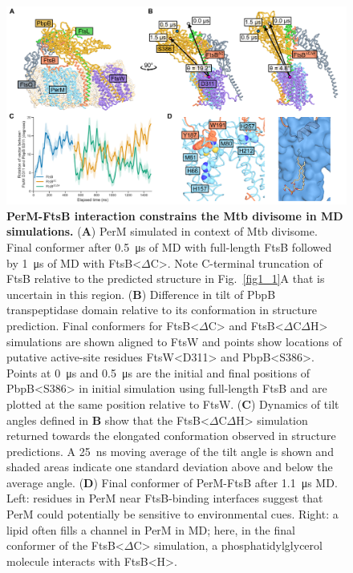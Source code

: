 \documentclass[twocolumn,pdflatex,sn-nature]{sn-jnl}%
\def\textsuperscript#1{<#1>}%
\newcommand\mtb{Mtb}
\newcommand\ftsbH{FtsB\textsuperscript{H}}
\newcommand\ftsbdCdH{FtsB\textsuperscript{$\Delta{}$C$\Delta{}$H}}
\newcommand\ftsbdC{FtsB\textsuperscript{$\Delta{}$C}}
\begin{document}
\begin{figure}[b]
    \centering
    \includegraphics[width=1.0\textwidth]{../figures/fig5.png}
    \caption{
        \textbf{PerM-FtsB interaction constrains the \mtb{} divisome in MD simulations.}
        (\textbf{A}) PerM simulated in context of \mtb{} divisome. Final conformer after \qty{0.5}{\us} of MD with full-length FtsB followed by \qty{1}{\us} of MD with \ftsbdC{}. Note C-terminal truncation of FtsB relative to the predicted structure in Fig.~\ref{fig1_1}A that is uncertain in this region.
        (\textbf{B}) Difference in tilt of PbpB transpeptidase domain relative to its conformation in structure prediction. Final conformers for \ftsbdC{} and \ftsbdCdH{} simulations are shown aligned to FtsW and points show locations of putative active-site residues FtsW\textsuperscript{D311} and PbpB\textsuperscript{S386}. Points at \qty{0}{\us} and \qty{0.5}{\us} are the initial and final positions of PbpB\textsuperscript{S386} in initial simulation using full-length FtsB and are plotted at the same position relative to FtsW.
        (\textbf{C}) Dynamics of tilt angles defined in \textbf{B} show that the \ftsbdCdH{} simulation returned towards the elongated conformation observed in structure predictions. A \qty{25}{\ns} moving average of the tilt angle is shown and shaded areas indicate one standard deviation above and below the average angle. (\textbf{D}) Final conformer of PerM-FtsB after \qty{1.1}{\us} MD. Left: residues in PerM near FtsB-binding interfaces suggest that PerM could potentially be sensitive to environmental cues. Right: a lipid often fills a channel in PerM in MD; here, in the final conformer of the \ftsbdC{} simulation, a phosphatidylglycerol molecule interacts with \ftsbH{}.
    }\label{fig5}
\end{figure}
\end{document}
